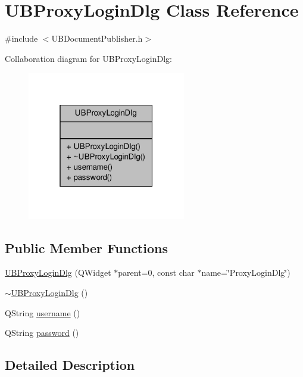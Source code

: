 \hypertarget{class_u_b_proxy_login_dlg}{\section{U\-B\-Proxy\-Login\-Dlg Class Reference}
\label{dd/dc1/class_u_b_proxy_login_dlg}
}


{\ttfamily \#include $<$U\-B\-Document\-Publisher.\-h$>$}



Collaboration diagram for U\-B\-Proxy\-Login\-Dlg\-:
\nopagebreak
\begin{figure}[H]
\begin{center}
\leavevmode
\includegraphics[width=196pt]{d4/d11/class_u_b_proxy_login_dlg__coll__graph}
\end{center}
\end{figure}
\subsection*{Public Member Functions}
\begin{DoxyCompactItemize}
\item 
\hyperlink{class_u_b_proxy_login_dlg_a2f2711bcb8d4c121c1410a3c8a6ff758}{U\-B\-Proxy\-Login\-Dlg} (Q\-Widget $\ast$parent=0, const char $\ast$name=\char`\"{}Proxy\-Login\-Dlg\char`\"{})
\item 
\hyperlink{class_u_b_proxy_login_dlg_a1bcc0d81ba37e3f4432d3d4c7f925ca3}{$\sim$\-U\-B\-Proxy\-Login\-Dlg} ()
\item 
Q\-String \hyperlink{class_u_b_proxy_login_dlg_a2631018e97c6611174dcd6e848e1b38e}{username} ()
\item 
Q\-String \hyperlink{class_u_b_proxy_login_dlg_a421c14f00dc8d1e5ef0025c6edfb8e3b}{password} ()
\end{DoxyCompactItemize}


\subsection{Detailed Description}



